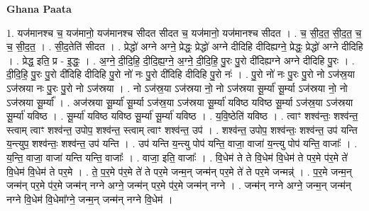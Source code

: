 \documentclass[17pt]{extarticle}
\begin{document}
\textbf{Ghana Paata } \newline

1. यज॑मानश्च च॒ यज॑मानो॒ यज॑मानश्च सीदत सीदत च॒ यज॑मानो॒ यज॑मानश्च सीदत । . च॒ सी॒द॒त॒ सी॒द॒त॒ च॒ च॒ सी॒द॒त॒ । . सी॒द॒तेति॑ सीदत । . प्रेद्धो॑ अग्ने अग्ने॒ प्रेद्धः॒ प्रेद्धो॑ अग्ने दीदिहि दीदिह्यग्ने॒ प्रेद्धः॒ प्रेद्धो॑ अग्ने दीदिहि । . प्रेद्ध॒ इति॒ प्र - इ॒द्धः॒ । . अ॒ग्ने॒ दी॒दि॒हि॒ दी॒दि॒ह्य॒ग्ने॒ अ॒ग्ने॒ दी॒दि॒हि॒ पु॒रः पु॒रो दी॑दिह्यग्ने अग्ने दीदिहि पु॒रः । . दी॒दि॒हि॒ पु॒रः पु॒रो दी॑दिहि दीदिहि पु॒रो नो॑ नः पु॒रो दी॑दिहि दीदिहि पु॒रो नः॑ । . पु॒रो नो॑ नः पु॒रः पु॒रो नो ऽज॑स्र॒या ऽज॑स्रया नः पु॒रः पु॒रो नो ऽज॑स्रया । . नो ऽज॑स्र॒या ऽज॑स्रया नो॒ नो ऽज॑स्रया सू॒र्म्या॑ सू॒र्म्या ऽज॑स्रया नो॒ नो ऽज॑स्रया सू॒र्म्या᳚ । . अज॑स्रया सू॒र्म्या॑ सू॒र्म्या ऽज॑स्र॒या ऽज॑स्रया सू॒र्म्या॑ यविष्ठ यविष्ठ सू॒र्म्या ऽज॑स्र॒या ऽज॑स्रया सू॒र्म्या॑ यविष्ठ । . सू॒र्म्या॑ यविष्ठ यविष्ठ सू॒र्म्या॑ सू॒र्म्या॑ यविष्ठ । . य॒वि॒ष्ठेति॑ यविष्ठ । . त्वाꣳ शश्व॑न्तः॒ शश्व॑न्त॒ स्त्वाम् त्वाꣳ शश्व॑न्त॒ उपोप॒ शश्व॑न्त॒ स्त्वाम् त्वाꣳ शश्व॑न्त॒ उप॑ । . शश्व॑न्त॒ उपोप॒ शश्व॑न्तः॒ शश्व॑न्त॒ उप॑ यन्ति य॒न्त्युप॒ शश्व॑न्तः॒ शश्व॑न्त॒ उप॑ यन्ति । . उप॑ यन्ति य॒न्त्यु पोप॑ यन्ति॒ वाजा॒ वाजा॑ य॒न्त्यु पोप॑ यन्ति॒ वाजाः᳚ । . य॒न्ति॒ वाजा॒ वाजा॑ यन्ति यन्ति॒ वाजाः᳚ । . वाजा॒ इति॒ वाजाः᳚ । . वि॒धेम॑ ते ते वि॒धेम॑ वि॒धेम॑ ते पर॒मे प॑र॒मे ते॑ वि॒धेम॑ वि॒धेम॑ ते पर॒मे । . ते॒ प॒र॒मे प॑र॒मे ते॑ ते पर॒मे जन्म॒न् जन्म॑न् पर॒मे ते॑ ते पर॒मे जन्मन्न्॑ । . प॒र॒मे जन्म॒न् जन्म॑न् पर॒मे प॑र॒मे जन्म॑न् नग्ने अग्ने॒ जन्म॑न् पर॒मे प॑र॒मे जन्म॑न् नग्ने । . जन्म॑न् नग्ने अग्ने॒ जन्म॒न् जन्म॑न् नग्ने वि॒धेम॑ वि॒धेमा᳚ग्ने॒ जन्म॒न् जन्म॑न् नग्ने वि॒धेम॑ । \newline
\end{document}
